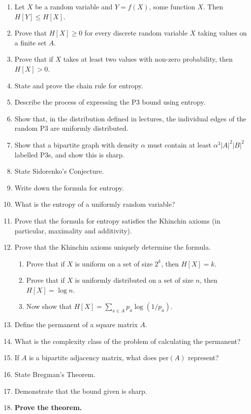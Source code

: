 \documentclass[10pt]{article}
\renewcommand{\rm}[1]{\mathrm{#1}}
\begin{document}
\begin{enumerate}
    \item Let $X$ be a random variable and $Y = f(X)$, some function $X$. Then $H[Y] \le H[X]$.
    \item Prove that $H[X] \ge 0$ for every discrete random variable $X$ taking values on a finite set $A$.
    \item Prove that if $X$ takes at least two values with non-zero probability, then $H[X] > 0$.
    \item State and prove the chain rule for entropy.
    \item Describe the process of expressing the P3 bound using entropy.
    \item Show that, in the distribution defined in lectures, the individual edges of the random P3 are uniformly distributed.
    \item Show that a bipartite graph with density $\alpha$ must contain at least $\alpha^3 |A|^2|B|^2$ labelled P3s, and show this is sharp.
    \item State Sidorenko's Conjecture.
    \item Write down the formula for entropy.
    \item What is the entropy of a uniformly random variable?
    \item Prove that the formula for entropy satisfies the Khinchin axioms (in particular, maximality and additivity).
    \item Prove that the Khinchin axioms uniquely determine the formula.
    \begin{enumerate}
        \item Prove that if $X$ is uniform on a set of size $2^k$, then $H[X] = k$.
        \item Prove that if $X$ is uniformly distributed on a set of size $n$, then $H[X] = \log n$.
        \item Now show that $H[X] = \sum_{x\in A} p_a\log(1/p_a)$.
    \end{enumerate}
    \item Define the permanent of a square matrix $A$.
    \item What is the complexity class of the problem of calculating the permanent?
    \item If $A$ is a bipartite adjacency matrix, what does $\rm{per}(A)$ represent?
    \item State Bregman's Theorem.
    \item Demonstrate that the bound given is sharp.
    \item \textbf{Prove the theorem.}

\end{enumerate}
\end{document}
